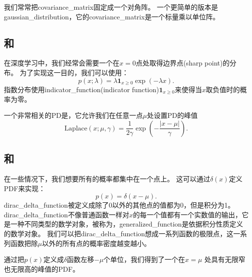 
我们常常把\gls{covariance_matrix}固定成一个对角阵。
一个更简单的版本是\gls{gaussian_distribution}，它的\gls{covariance_matrix}是一个标量乘以单位阵。

\subsection{和}
\label{sec:exponential_and_laplace_distributions}

在深度学习中，我们经常会需要一个在$x=0$点处取得边界点(sharp point)的分布。
为了实现这一目的，我们可以使用：
\begin{equation}
p(x; \lambda) = \lambda \bm{1}_{x\ge 0} \exp(-\lambda x).
\end{equation}
指数分布使用\gls{indicator_function}(indicator function)$\bm{1}_{x\ge 0}$来使得当$x$取负值时的概率为零。

一个非常相关的\gls{PD}是，它允许我们在任意一点$\mu$处设置\gls{PD}的峰值
\begin{equation}
\label{eq:chap3_laplace}
\text{Laplace}(x; \mu, \gamma) = \frac{1}{2\gamma} \exp \left( -\frac{|x-\mu|}{\gamma}  \right).
\end{equation}

\subsection{和}
\label{sec:the_dirac_distribution_and_empirical_distribution}

在一些情况下，我们想要所有的概率都集中在一个点上。
这可以通过$\delta(x)$定义\gls{PDF}来实现：
\begin{equation}
p(x) = \delta(x-\mu).
\end{equation}
\gls{dirac_delta_function}被定义成除了0以外的其他点的值都为0，但是积分为1。
\gls{dirac_delta_function}不像普通函数一样对$x$的每一个值都有一个实数值的输出，它是一种不同类型的数学对象，被称为，\gls{generalized_function}是依据积分性质定义的数学对象。
我们可以把\gls{dirac_delta_function}想成一系列函数的极限点，这一系列函数把除$\mu$以外的所有点的概率密度越变越小。


通过把$p(x)$定义成$\delta$函数左移$-\mu$个单位，我们得到了一个在$x=\mu$ 处具有无限窄也无限高的峰值的\gls{PDF}。

